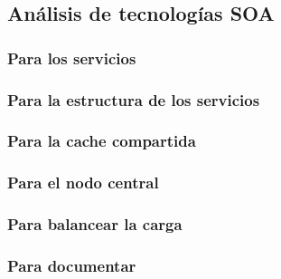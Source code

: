 \subsection{Análisis de tecnologías SOA}
\label{soa:tecnologias}


\subsubsection{Para los servicios}






\subsubsection{Para la estructura de los servicios}




\subsubsection{Para la cache compartida}





\subsubsection{Para el nodo central}









\subsubsection{Para balancear la carga}





\subsubsection{Para documentar}





